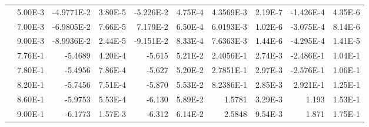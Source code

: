 \documentclass[10pt, twocolumn]{revtex4}    %
\begin{document}
\begin{table}[]
{\begin{tabular}{@{}rrrrrrrrrr@{}}
			& 5.00E-3   & -4.9771E-2       & 3.80E-5 & -5.226E-2         & 4.75E-4 & 4.3569E-3        & 2.19E-7 & -1.426E-4         & 4.35E-6 \\
			& 7.00E-3   & -6.9805E-2       & 7.66E-5 & 7.179E-2          & 6.50E-4 & 6.0193E-3        & 1.02E-6 & -3.075E-4         & 8.14E-6 \\
			& 9.00E-3   & -8.9936E-2       & 2.44E-5 & -9.151E-2         & 8.33E-4 & 7.6363E-3        & 1.44E-6 & -4.295E-4         & 1.41E-5 \\
			& 7.76E-1   & -5.4689       & 4.20E-4 & -5.615            & 5.21E-2 & 2.4056E-1        & 2.74E-3 & -2.486E-1         & 1.04E-1 \\
			& 7.80E-1   & -5.4956       & 7.86E-4 & -5.627            & 5.20E-2 & 2.7851E-1        & 2.97E-3 & -2.576E-1         & 1.06E-1 \\
			& 8.20E-1   & -5.7456       & 7.51E-4 & -5.870            & 5.53E-2 & 8.2386E-1        & 2.85E-3 & 2.921E-1          & 1.25E-1 \\
			& 8.60E-1   & -5.9753       & 5.53E-4 & -6.130            & 5.89E-2 & 1.5781        & 3.29E-3 & 1.193             & 1.53E-1 \\
			& 9.00E-1   & -6.1773       & 1.57E-3 & -6.312            & 6.14E-2 & 2.5848        & 9.54E-3 & 1.871             & 1.75E-1 \\ \bottomrule
		\end{tabular}%
	}
\end{table}
\end{document}
